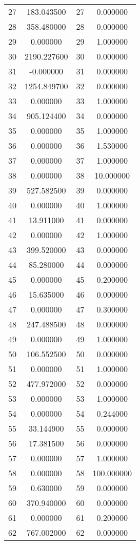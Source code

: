 \documentclass[12pt]{article}
\begin{document}
\begin{longtable}{@{}cccc@{}}
27 & 183.043500 & 27 & 0.000000 \\
28 & 358.480000 & 28 & 0.000000 \\
29 & 0.000000 & 29 & 1.000000 \\
30 & 2190.227600 & 30 & 0.000000 \\
31 & -0.000000 & 31 & 0.000000 \\
32 & 1254.849700 & 32 & 0.000000 \\
33 & 0.000000 & 33 & 1.000000 \\
34 & 905.124400 & 34 & 0.000000 \\
35 & 0.000000 & 35 & 1.000000 \\
36 & 0.000000 & 36 & 1.530000 \\
37 & 0.000000 & 37 & 1.000000 \\
38 & 0.000000 & 38 & 10.000000 \\
39 & 527.582500 & 39 & 0.000000 \\
40 & 0.000000 & 40 & 1.000000 \\
41 & 13.911000 & 41 & 0.000000 \\
42 & 0.000000 & 42 & 1.000000 \\
43 & 399.520000 & 43 & 0.000000 \\
44 & 85.280000 & 44 & 0.000000 \\
45 & 0.000000 & 45 & 0.200000 \\
46 & 15.635000 & 46 & 0.000000 \\
47 & 0.000000 & 47 & 0.300000 \\
48 & 247.488500 & 48 & 0.000000 \\
49 & 0.000000 & 49 & 1.000000 \\
50 & 106.552500 & 50 & 0.000000 \\
51 & 0.000000 & 51 & 1.000000 \\
52 & 477.972000 & 52 & 0.000000 \\
53 & 0.000000 & 53 & 1.000000 \\
54 & 0.000000 & 54 & 0.244000 \\
55 & 33.144900 & 55 & 0.000000 \\
56 & 17.381500 & 56 & 0.000000 \\
57 & 0.000000 & 57 & 1.000000 \\
58 & 0.000000 & 58 & 100.000000 \\
59 & 0.630000 & 59 & 0.000000 \\
60 & 370.940000 & 60 & 0.000000 \\
61 & 0.000000 & 61 & 0.200000 \\
62 & 767.002000 & 62 & 0.000000 \\

\end{longtable}
\end{document}
